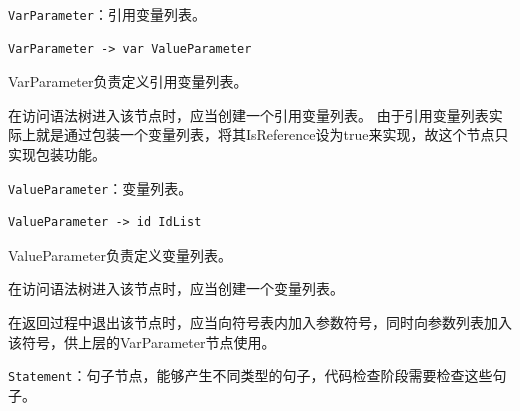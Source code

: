 \documentclass[../main.tex]{subfiles}
\begin{document}
\texttt{VarParameter}：引用变量列表。

\begin{lstlisting}[style=grammar]
VarParameter -> var ValueParameter
\end{lstlisting}

VarParameter负责定义引用变量列表。

在访问语法树进入该节点时，应当创建一个引用变量列表。
由于引用变量列表实际上就是通过包装一个变量列表，将其IsReference设为true来实现，故这个节点只实现包装功能。

\texttt{ValueParameter}：变量列表。

\begin{lstlisting}[style=grammar]
ValueParameter -> id IdList
\end{lstlisting}

ValueParameter负责定义变量列表。

在访问语法树进入该节点时，应当创建一个变量列表。

在返回过程中退出该节点时，应当向符号表内加入参数符号，同时向参数列表加入该符号，供上层的VarParameter节点使用。

\texttt{Statement}：句子节点，能够产生不同类型的句子，代码检查阶段需要检查这些句子。
\end{document}
